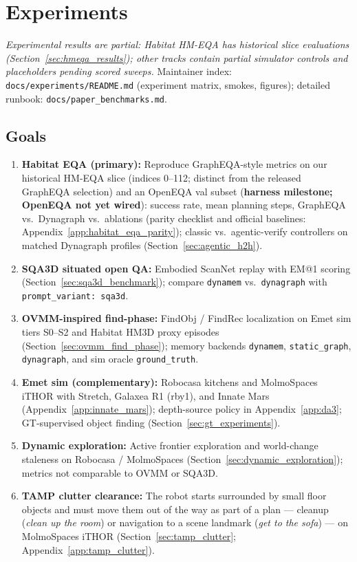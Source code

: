 \section{Experiments}
\label{sec:experiments}

\textit{Experimental results are partial: Habitat HM-EQA has historical slice evaluations (Section~\ref{sec:hmeqa_results}); other tracks contain partial simulator controls and placeholders pending scored sweeps.}
Maintainer index: \texttt{docs/experiments/README.md} (experiment matrix, smokes, figures); detailed runbook: \texttt{docs/paper\_benchmarks.md}.

\subsection{Goals}

\begin{enumerate}
  \item \textbf{Habitat EQA (primary):} Reproduce GraphEQA-style metrics on our historical HM-EQA slice (indices 0--112; distinct from the released GraphEQA selection) and an OpenEQA val subset (\textbf{harness milestone; OpenEQA not yet wired}): success rate, mean planning steps, GraphEQA vs.\ Dynagraph vs.\ ablations (parity checklist and official baselines: Appendix~\ref{app:habitat_eqa_parity}); classic vs.\ agentic-verify controllers on matched Dynagraph profiles (Section~\ref{sec:agentic_h2h}).
  \item \textbf{SQA3D situated open QA:} Embodied ScanNet replay with EM@1 scoring (Section~\ref{sec:sqa3d_benchmark}); compare \texttt{dynamem} vs.\ \texttt{dynagraph} with \texttt{prompt\_variant: sqa3d}.
  \item \textbf{OVMM-inspired find-phase:} FindObj / FindRec localization on Emet sim tiers S0--S2 and Habitat HM3D proxy episodes (Section~\ref{sec:ovmm_find_phase}); memory backends \texttt{dynamem}, \texttt{static\_graph}, \texttt{dynagraph}, and sim oracle \texttt{ground\_truth}.
  \item \textbf{Emet sim (complementary):} Robocasa kitchens and MolmoSpaces iTHOR with Stretch, Galaxea R1 (rby1), and Innate Mars (Appendix~\ref{app:innate_mars}); depth-source policy in Appendix~\ref{app:da3}; GT-supervised object finding (Section~\ref{sec:gt_experiments}).
  \item \textbf{Dynamic exploration:} Active frontier exploration and world-change staleness on Robocasa / MolmoSpaces (Section~\ref{sec:dynamic_exploration}); metrics not comparable to OVMM or SQA3D.
  \item \textbf{TAMP clutter clearance:} The robot starts surrounded by small floor objects and must move them out of the way as part of a plan --- cleanup (\emph{clean up the room}) or navigation to a scene landmark (\emph{get to the sofa}) --- on MolmoSpaces iTHOR (Section~\ref{sec:tamp_clutter}; Appendix~\ref{app:tamp_clutter}).
\end{enumerate}

